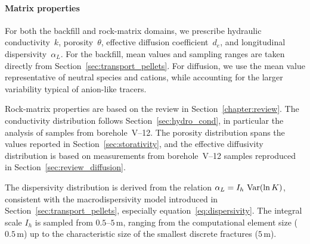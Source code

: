 \paragraph{Matrix properties}
For both the backfill and rock-matrix domains, we prescribe hydraulic
conductivity~$k$, porosity~$\theta$,
effective diffusion coefficient~$d_e$, and longitudinal dispersivity~$\alpha_L$.
For the backfill, mean values and sampling ranges are taken directly from
Section~\ref{sec:transport_pellets}.
For diffusion, we use the mean value representative of neutral species and
cations, while accounting for the larger variability typical of anion-like
tracers.

Rock-matrix properties are based on the review in
Section~\ref{chapter:review}.
The conductivity distribution follows Section~\ref{sec:hydro_cond}, in
particular the analysis of samples from borehole~V--12.
The porosity distribution spans the values reported in
Section~\ref{sec:storativity}, and the effective diffusivity distribution
is based on measurements from borehole~V--12 samples reproduced in
Section~\ref{sec:review_diffusion}.

The dispersivity distribution is derived from the relation
$\alpha_L = I_h\,\mathop{\rm Var}(\ln K)$, consistent with the macrodispersivity model
introduced in Section~\ref{sec:transport_pellets}, especially
equation~\eqref{eq:dispersivity}.
The integral scale $I_h$ is sampled from $0.5$--$5\,\mathrm{m}$, ranging from
the computational element size ($0.5\,\mathrm{m}$)
up to the characteristic size of the smallest discrete fractures
($5\,\mathrm{m}$).

